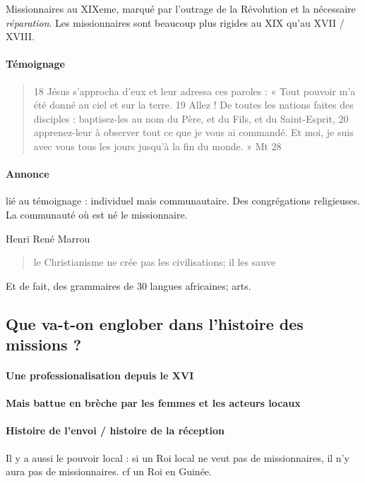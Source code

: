 \begin{Ex}
Missionnaires au XIXeme, marqué par l'outrage de la Révolution et la nécessaire \textit{réparation}. Les missionnaires sont beaucoup plus rigides au XIX qu'au XVII / XVIII. 
\end{Ex} 


\paragraph{Témoignage}
\begin{quote}
18 Jésus s’approcha d’eux et leur adressa ces paroles : « Tout pouvoir m’a été donné au ciel et sur la terre.
19 Allez ! De toutes les nations faites des disciples : baptisez-les au nom du Père, et du Fils, et du Saint-Esprit,
20 apprenez-leur à observer tout ce que je vous ai commandé. Et moi, je suis avec vous tous les jours jusqu’à la fin du monde. » Mt 28
\end{quote}

\paragraph{Annonce} lié au témoignage : individuel mais communautaire. Des congrégations religieuses. La communauté où est né le missionnaire. 

Henri René Marrou
\begin{quote}
le Christianisme ne crée pas les civilisations; il les sauve
\end{quote}
Et de fait, des grammaires de 30 langues africaines; arts.  


\subsection{Que va-t-on englober dans l'histoire des missions ?}

\paragraph{Une professionalisation depuis le XVI}

\paragraph{Mais battue en brèche par les femmes et les acteurs locaux}

\paragraph{Histoire de l'envoi / histoire de la réception} Il y a aussi le pouvoir local : si un Roi local ne veut pas de missionnaires, il n'y aura pas de missionnaires. cf un Roi en Guinée. 

